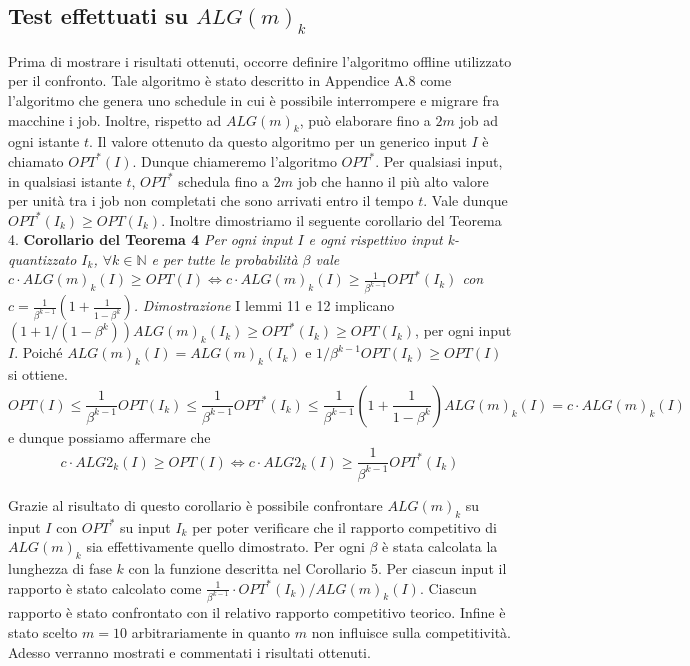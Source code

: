 \documentclass[12pt]{article}
\newcommand*{\N}{\mathbb{N}}
\begin{document}
\subsection{Test effettuati su $ALG(m)_{k}$}
Prima di mostrare i risultati ottenuti, occorre definire l’algoritmo offline utilizzato per il confronto. Tale algoritmo è stato descritto in Appendice A.8 come l’algoritmo che genera uno schedule in cui è possibile interrompere e migrare fra macchine i job. Inoltre, rispetto ad $ALG(m)_{k}$, può elaborare fino a $2m$ job ad ogni istante $t$. Il valore ottenuto da questo algoritmo  per un generico input $I$ è chiamato $OPT^{*}(I)$. Dunque chiameremo l'algoritmo $OPT^{*}$. Per qualsiasi input, in qualsiasi istante $t$, $OPT^{*}$ schedula fino a $2m$ job che hanno il più alto valore per unità tra i job non completati che sono arrivati entro il tempo $t$. Vale dunque $OPT^{*}(I_{k}) \geq OPT(I_{k})$. Inoltre dimostriamo il seguente corollario del Teorema 4.
\newline \newline
\textbf{Corollario del Teorema 4}
\textit{Per ogni input $I$ e ogni rispettivo input k-quantizzato $I_{k}$, $\forall k \in \N$ e per tutte le probabilità $\beta$ vale
$c \cdot ALG(m)_{k}(I) \geq OPT(I) \iff c \cdot ALG(m)_{k}(I) \geq \frac{1}{\beta^{k-1}} OPT^{*}(I_{k})$ con $c = \frac{1}{\beta^{k - 1} } (1 + \frac{1}{1 - \beta^{k}})$.}
\newline \newline
\textit{Dimostrazione} 
I lemmi 11 e 12 implicano $(1 + 1 / (1 - \beta^{k}))ALG(m)_{k}(I_{k}) \geq OPT^{*}(I_{k}) \geq OPT (I_{k})$, per ogni input $I$. Poiché $ALG(m)_{k}(I) = ALG(m)_{k}(I_{k})$ e $1 / \beta^{k-1}OPT (I_{k}) \geq OPT (I)$ si ottiene. 
$$OPT(I) \leq \frac{1}{\beta^{k-1}} OPT(I_{k}) \leq \frac{1}{\beta^{k-1}} OPT^{*}(I_{k}) \leq \frac{1}{\beta^{k-1}} (1 + \frac{1}{1 - \beta^{k}}) ALG(m)_{k}(I) = c \cdot ALG(m)_{k}(I)$$
e dunque possiamo affermare che
\begin{equation}
c \cdot ALG2_{k}(I) \geq OPT(I) \iff c \cdot ALG2_{k}(I) \geq \frac{1}{\beta^{k-1}} OPT^{*}(I_{k}) \tag*{$\square$}
\end{equation}

Grazie al risultato di questo corollario è possibile confrontare $ALG(m)_{k}$ su input $I$ con $OPT^{*}$ su input $I_{k}$ per poter verificare che il rapporto competitivo di $ALG(m)_{k}$ sia effettivamente quello dimostrato. Per ogni $\beta$ è stata calcolata la lunghezza di fase $k$ con la funzione descritta nel Corollario 5. Per ciascun input il rapporto è stato calcolato come $\frac{1}{\beta^{k-1}} \cdot OPT^{*}(I_{k}) / ALG(m)_{k}(I)$. Ciascun rapporto è stato confrontato con il relativo rapporto competitivo teorico. Infine è stato scelto $m=10$ arbitrariamente in quanto $m$ non influisce sulla competitività. Adesso verranno mostrati e commentati i risultati ottenuti.
\end{document}
